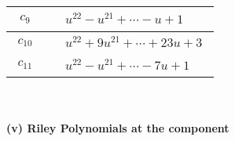 \documentclass[1p]{elsarticle_modified}
\theoremstyle{definition}
\begin{document}
\begin{tabular}{m{50pt}|m{274pt}}
\hline $$\begin{aligned}c_{9}\end{aligned}$$&$\begin{aligned}
&u^{22}- u^{21}+\cdots- u+1
\end{aligned}$\\
\hline $$\begin{aligned}c_{10}\end{aligned}$$&$\begin{aligned}
&u^{22}+9 u^{21}+\cdots+23 u+3
\end{aligned}$\\
\hline $$\begin{aligned}c_{11}\end{aligned}$$&$\begin{aligned}
&u^{22}- u^{21}+\cdots-7 u+1
\end{aligned}$\\
\hline
\end{tabular}\\~\\
\newpage\renewcommand{\arraystretch}{1}
\flushleft \textbf{(v) Riley Polynomials at the component}\newline \\
\end{document}
